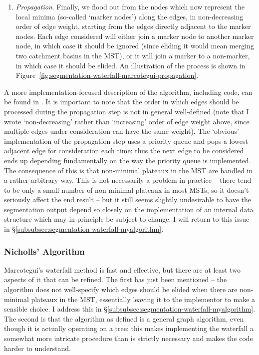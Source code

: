 \begin{enumerate}
\item \emph{Propagation}. Finally, we flood out from the nodes which now represent the local minima (so-called `marker nodes') along the edges, in non-decreasing order of edge weight, starting from the edges directly adjacent to the marker nodes. Each edge considered will either join a marker node to another marker node, in which case it should be ignored (since eliding it would mean merging two catchment basins in the MST), or it will join a marker to a non-marker, in which case it should be elided. An illustration of the process is shown in Figure~\ref{fig:segmentation-waterfall-marcotegui-propagation}.

\end{enumerate}

\noindent A more implementation-focused description of the algorithm, including code, can be found in \cite{golodetz08}. It is important to note that the order in which edges should be processed during the propagation step is not in general well-defined (note that I wrote `non-decreasing' rather than `increasing' order of edge weight above, since multiple edges under consideration can have the same weight). The `obvious' implementation of the propagation step uses a priority queue and pops a lowest adjacent edge for consideration each time: thus the next edge to be considered ends up depending fundamentally on the way the priority queue is implemented. The consequence of this is that non-minimal plateaux in the MST are handled in a rather arbitrary way. This is not necessarily a problem in practice -- there tend to be only a small number of non-minimal plateaux in most MSTs, so it doesn't seriously affect the end result -- but it still seems slightly undesirable to have the segmentation output depend so closely on the implementation of an internal data structure which may in principle be subject to change. I will return to this issue in \S\ref{subsubsec:segmentation-waterfall-myalgorithm}.

\subsubsection{Nicholls' Algorithm}

Marcotegui's waterfall method is fast and effective, but there are at least two aspects of it that can be refined. The first has just been mentioned -- the algorithm does not well-specify which edges should be elided when there are non-minimal plateaux in the MST, essentially leaving it to the implementor to make a sensible choice. I address this in \S\ref{subsubsec:segmentation-waterfall-myalgorithm}. The second is that the algorithm as defined is a general graph algorithm, even though it is actually operating on a tree: this makes implementing the waterfall a somewhat more intricate procedure than is strictly necessary and makes the code harder to understand.

